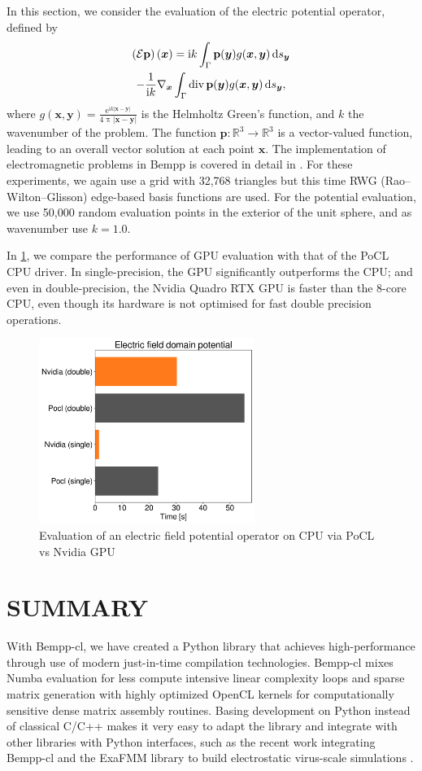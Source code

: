 \documentclass{IEEEcsmag}
\newcommand{\bvec}[1]{\boldsymbol{#1}}
\def\bx{\bvec{x}}
\def\by{\bvec{y}}
\newcommand{\ds}[1][]{\,\mathrm{d}s\ifthenelse{\equal{#1}{}}{}{_{#1}}}
\newcommand{\ii}{\mathrm{i}}
\newcommand{\ee}{\mathrm{e}}
\begin{document}
In this section, we consider the evaluation of the electric potential operator, defined by
\begin{multline}
	\left(\mathcal{E}\mathbf{p}\right)(\bx) = \ii k\int_{\Gamma}\mathbf{p}(\by)g(\bx, \by) \ds[\by]\\
	-\frac{1}{\ii k}\nabla_{\bx}\int_{\Gamma}\operatorname{div}\mathbf{p}(\by)g(\bx, \by)\ds[\by],
\end{multline}
where $g(\bx, \by) = \frac{\ee^{\ii k|\bx - \by|}}{4\uppi|\bx - \by|}$ is the Helmholtz Green's function, and
$k$ the wavenumber of the problem.
The function $\mathbf{p}:\mathbb{R}^3\to\mathbb{R}^3$ is a vector-valued function, leading to an overall vector solution at each point $\bx$. The implementation of electromagnetic problems in Bempp is covered in detail in \cite{bempp_maxwell}. For these experiments, we again use a grid with 32,768 triangles but this time RWG (Rao--Wilton--Glisson) edge-based basis functions are used. For the potential evaluation, we use 50,000 random evaluation points in the exterior of the unit sphere, and as wavenumber use $k=1.0$.

In \cref{fig:efield_domain_potential}, we compare the performance of GPU evaluation with that of the PoCL CPU driver. In single-precision, the GPU significantly outperforms the CPU; and even in double-precision, the Nvidia Quadro RTX GPU is faster than the 8-core CPU, even though its hardware is not optimised for fast double precision operations.

\begin{figure}
	\center
	\includegraphics[width=7cm]{efield_domain_potential.pdf}
	\caption{Evaluation of an electric field potential operator on CPU via PoCL vs Nvidia GPU}
	\label{fig:efield_domain_potential}
\end{figure}

\section{SUMMARY}
With Bempp-cl, we have created a Python library that achieves high-performance through use of modern just-in-time compilation technologies. Bempp-cl mixes Numba evaluation for less compute intensive linear complexity loops and sparse matrix generation with highly optimized OpenCL kernels for computationally sensitive dense matrix assembly routines. Basing development on Python instead of classical C/C++ makes it very easy to adapt the library and integrate with other libraries with Python interfaces, such as the recent work integrating Bempp-cl and the ExaFMM library to build electrostatic virus-scale simulations \cite{bempp_exafmm}.
\end{document}
